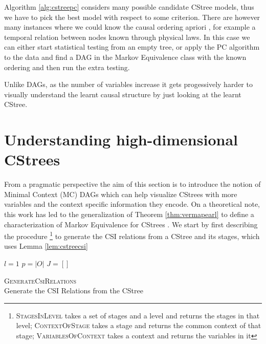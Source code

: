 \documentclass{tufte-book}
\begin{document}
Algorithm \ref{alg:cstreepc} considers many possible candidate CStree models, thus we have to pick the best model with respect to some criterion. There are however many instances where we could know the causal ordering apriori \cite{thwaites-2010-causal-analy,silander-2013}, for example a temporal relation between nodes known through physical laws. In this case we can either start statistical testing from an empty tree, or apply the PC algorithm to the data and find a DAG in the Markov Equivalence class with the known ordering and then run the extra testing.



Unlike DAGs, as the number of variables increase it gets progessively harder to visually understand the learnt causal structure by just looking at the learnt CStree.






\section{Understanding high-dimensional CStrees}
\label{sec:org956eefc}
From a pragmatic perspective the aim of this section is to introduce the notion of Minimal Context (MC) DAGs which can help visualize CStrees with more variables and the context specific information they encode. On a theoretical note, this work has led to
  the generalization of Theorem \ref{thm:vermapearl} to define a characterization of Markov Equivalence for CStrees \cite{duarte-2021-repres-learn}. We start by first describing the procedure  \footnote{\textsc{StagesInLevel} takes a set of stages and a level and returns the stages in that level; \textsc{ContextOfStage} takes a stage and returns the common context of that stage; \textsc{VariablesOfContext} takes a context and returns the variables in it}  to generate the CSI relations from a CStree and its stages, which uses Lemma \ref{lem:cstreecsi}

   \begin{algorithm}\label{alg:gencsirels}
  \SetAlgoLined
  $l=1$\;
  $p=|O|$\;
  $J = []$\;
  
\caption{\textsc{GenerateCsiRelations} \\ Generate the CSI Relations from the CStree}

   \end{algorithm}
\end{document}
